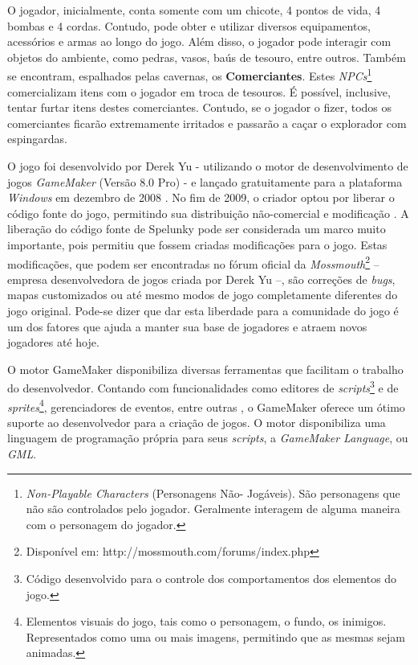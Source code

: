 O jogador, inicialmente, conta somente com um chicote, 4 pontos de vida, 4
bombas e 4 cordas. Contudo, pode obter e utilizar diversos equipamentos,
acessórios e armas ao longo do jogo. Além disso, o jogador pode interagir com
objetos do ambiente, como pedras, vasos, baús de tesouro, entre outros. Também
se encontram, espalhados pelas cavernas, os \textbf{Comerciantes}. Estes
\textit{NPCs}\footnote{\textit{Non-Playable Characters} (Personagens Não-
Jogáveis). São personagens que não são controlados pelo jogador. Geralmente
interagem de alguma maneira com o personagem do jogador.} comercializam itens
com o jogador em troca de tesouros. É possível, inclusive, tentar furtar itens
destes comerciantes. Contudo, se o jogador o fizer, todos os comerciantes
ficarão extremamente irritados e passarão a caçar o explorador com espingardas.

O jogo foi desenvolvido por Derek Yu - utilizando o motor de desenvolvimento de
jogos \textit{GameMaker} (Versão 8.0 Pro) - e lançado gratuitamente para a
plataforma \textit{Windows} em dezembro de 2008 \cite{SPELUNKYRELEASE}. No fim
de 2009, o criador optou por liberar o código fonte do jogo, permitindo sua
distribuição não-comercial e modificação \cite{SPELUNKYLICENSE}. A liberação do
código fonte de Spelunky pode ser considerada um marco muito importante, pois
permitiu que fossem criadas modificações para o jogo. Estas modificações, que
podem ser encontradas no fórum oficial da
\textit{Mossmouth}\footnote{Disponível em:
http://mossmouth.com/forums/index.php} -- empresa desenvolvedora de jogos
criada por Derek Yu --, são correções de \textit{bugs}, mapas customizados ou
até mesmo modos de jogo completamente diferentes do jogo original. Pode-se
dizer que dar esta liberdade para a comunidade do jogo é um dos fatores que
ajuda a manter sua base de jogadores e atraem novos jogadores até hoje.

O motor GameMaker disponibiliza diversas ferramentas que facilitam o trabalho
do desenvolvedor. Contando com funcionalidades como editores de
\textit{scripts}\footnote{Código desenvolvido para o controle dos
comportamentos dos elementos do jogo.} e de \textit{sprites}\footnote{Elementos
visuais do jogo, tais como o personagem, o fundo, os inimigos. Representados
como uma ou mais imagens, permitindo que as mesmas sejam animadas.},
gerenciadores de eventos, entre outras \cite{GMAKER8DOCS}, o GameMaker oferece
um ótimo suporte ao desenvolvedor para a criação de jogos. O motor
disponibiliza uma linguagem de programação própria para seus \textit{scripts},
a \textit{GameMaker Language}, ou \textit{GML}.


